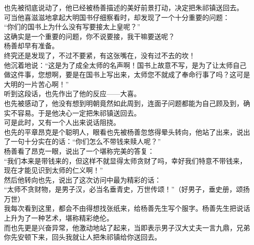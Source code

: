 \begin{multicols}{\theparacolNo}
也先被彻底说动了，他已经被杨善描述的美好前景打动，决定把朱祁镇送回去。\\

可当他喜滋滋地拿起大明国书仔细察看时，却发现了一个十分重要的问题：\\

“你们的国书上为什么没有写要接太上皇呢？”\\

这确实是一个重要的问题，你不说要接，我干嘛要送呢？\\

杨善却早有准备。\\

终究还是发现了，不过不要紧，有这张嘴在，没有过不去的坎！\\

他沉着地说：“这是为了成全太师的名声啊！国书上故意不写，是为了让太师自己做这件事，您想啊，要是在国书上写出来，太师您不就成了奉命行事了吗？这可是大明的一片苦心啊！”\\

听到这段话，也先作出了他的反应——大喜。\\

也先被感动了，他没有想到明朝竟然如此周到，连面子问题都能为自己顾及到，确实不容易。于是他决心一定把朱祁镇送回去。\\

可是此时，又有一个人出来说话阻挠。\\

也先的平章昂克是个聪明人，眼看也先被杨善忽悠得晕头转向，他站了出来，说出了一句十分实在的话：“你们怎么不带钱来赎人呢？”\\

杨善看了昂克一眼，说出了一个堪称完美的答复：\\

“我们本来是带钱来的，但这样不就显得太师贪财了吗，幸好我们特意不带钱来，现在才能见识到太师的仁义啊！”\\

然后他转向也先，说出了这次访问中最为精彩的话：\\

“太师不贪财物，是男子汉，必当名垂青史，万世传颂！”（好男子，垂史册，颂扬万世）\\

我每次看到这里，都会不由得想找张纸来，给杨善先生写个服字。杨善先生把说话上升为了一种艺术，堪称精彩绝伦。\\

而也先更是兴奋异常，他激动地站了起来，当即表示男子汉大丈夫一言九鼎，兄弟你先安顿下来，回头我就让人把朱祁镇给你送回去。\\


\end{multicols}
